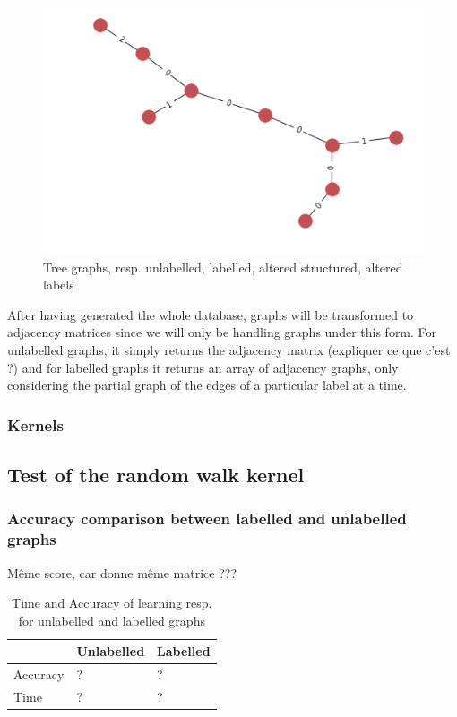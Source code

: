 \documentclass{article}
\theoremstyle{definition}
\begin{document}
\begin{figure}[!htb]
\begin{multicols}{4}
    \includegraphics[width=\linewidth]{data/generated-graphs/tree_altered_labels.png}\par
\end{multicols}
\caption{Tree graphs, resp. unlabelled, labelled, altered structured, altered labels}
\end{figure}
After having generated the whole database, graphs will be transformed to adjacency matrices since we will only be handling graphs under this form. For unlabelled graphs, it simply returns the adjacency matrix (expliquer ce que c'est ?) and for labelled graphs it returns an array of adjacency graphs, only considering the partial graph of the edges of a particular label at a time.
\subsubsection{Kernels}

\subsection{Test of the random walk kernel}
\subsubsection{Accuracy comparison between labelled and unlabelled graphs}
Même score, car donne même matrice ???
\begin{table}[!htb]
\begin{center}
\begin{tabular}{|l|l|l|}
    \hline
    & Unlabelled & Labelled \\
    \hline
    Accuracy & ? & ? \\
    \hline
    Time & ? & ? \\
    \hline
\end{tabular}
\end{center}
\caption {Time and Accuracy of learning resp. for unlabelled and labelled graphs} \label{tab:lab_vs_nolab} 
\end{table}
\end{document}
